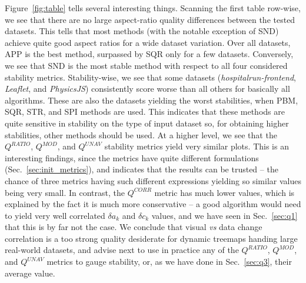 Figure~\ref{fig:table} tells several interesting things. Scanning the first table row-wise, we see that there are no large aspect-ratio quality differences between the tested datasets. This tells that most methods (with the notable exception of SND) achieve quite good aspect ratios for a wide dataset variation. Over all datasets, APP is the best method, surpassed by SQR only for a few datasets. Conversely, we see that SND is the most stable method with respect to all four considered stability metrics. Stability-wise, we see that some datasets (\emph{hospitalrun-frontend}, \emph{Leaflet}, and \emph{PhysicsJS}) consistently score worse than all others for basically all algorithms. These are also the datasets yielding the worst stabilities, when PBM, SQR, STR, and SPI methods are used. This indicates that these methods are quite sensitive in stability on the type of input dataset so, for obtaining higher stabilities, other methods should be used. At a higher level, we see that the $Q^{RATIO}$, $Q^{MOD}$, and $Q^{UNAV}$ stability metrics yield very similar plots. This is an interesting findings, since the metrics have quite different formulations (Sec.~\ref{sec:init_metrics}), and indicates that the results can be trusted -- the chance of three metrics having such different expressions yielding so similar values being very small. In contrast, the $Q^{CORR}$ metric has much lower values, which is explained by the fact it is much more conservative -- a good algorithm would need to yield very well correlated $\delta a_k$ and $\delta c_k$ values, and we have seen in Sec.~\ref{sec:q1} that this is by far not the case. We conclude that visual \emph{vs} data change correlation is a too strong quality desiderate for dynamic treemaps handing large real-world datasets, and advise next to use in practice any of the $Q^{RATIO}$, $Q^{MOD}$, and $Q^{UNAV}$ metrics to gauge stability, or, as we have done in Sec.~\ref{sec:q3}, their average value.

